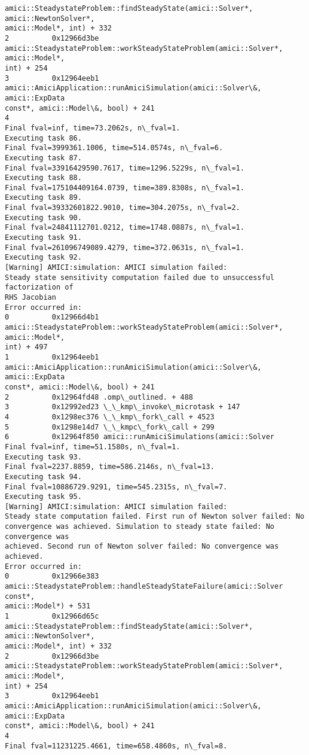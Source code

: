 \documentclass[11pt]{article}
\begin{document}
\begin{Verbatim}[commandchars=\\\{\}]
amici::SteadystateProblem::findSteadyState(amici::Solver*, amici::NewtonSolver*,
amici::Model*, int) + 332
2          0x12966d3be
amici::SteadystateProblem::workSteadyStateProblem(amici::Solver*, amici::Model*,
int) + 254
3          0x12964eeb1
amici::AmiciApplication::runAmiciSimulation(amici::Solver\&, amici::ExpData
const*, amici::Model\&, bool) + 241
4
Final fval=inf, time=73.2062s, n\_fval=1.
Executing task 86.
Final fval=3999361.1006, time=514.0574s, n\_fval=6.
Executing task 87.
Final fval=33916429590.7617, time=1296.5229s, n\_fval=1.
Executing task 88.
Final fval=175104409164.0739, time=389.8308s, n\_fval=1.
Executing task 89.
Final fval=39332601822.9010, time=304.2075s, n\_fval=2.
Executing task 90.
Final fval=24841112701.0212, time=1748.0887s, n\_fval=1.
Executing task 91.
Final fval=261096749089.4279, time=372.0631s, n\_fval=1.
Executing task 92.
[Warning] AMICI:simulation: AMICI simulation failed:
Steady state sensitivity computation failed due to unsuccessful factorization of
RHS Jacobian
Error occurred in:
0          0x12966d4b1
amici::SteadystateProblem::workSteadyStateProblem(amici::Solver*, amici::Model*,
int) + 497
1          0x12964eeb1
amici::AmiciApplication::runAmiciSimulation(amici::Solver\&, amici::ExpData
const*, amici::Model\&, bool) + 241
2          0x12964fd48 .omp\_outlined. + 488
3          0x12992ed23 \_\_kmp\_invoke\_microtask + 147
4          0x1298ec376 \_\_kmp\_fork\_call + 4523
5          0x1298e14d7 \_\_kmpc\_fork\_call + 299
6          0x12964f850 amici::runAmiciSimulations(amici::Solver
Final fval=inf, time=51.1580s, n\_fval=1.
Executing task 93.
Final fval=2237.8859, time=586.2146s, n\_fval=13.
Executing task 94.
Final fval=10886729.9291, time=545.2315s, n\_fval=7.
Executing task 95.
[Warning] AMICI:simulation: AMICI simulation failed:
Steady state computation failed. First run of Newton solver failed: No
convergence was achieved. Simulation to steady state failed: No convergence was
achieved. Second run of Newton solver failed: No convergence was achieved.
Error occurred in:
0          0x12966e383
amici::SteadystateProblem::handleSteadyStateFailure(amici::Solver const*,
amici::Model*) + 531
1          0x12966d65c
amici::SteadystateProblem::findSteadyState(amici::Solver*, amici::NewtonSolver*,
amici::Model*, int) + 332
2          0x12966d3be
amici::SteadystateProblem::workSteadyStateProblem(amici::Solver*, amici::Model*,
int) + 254
3          0x12964eeb1
amici::AmiciApplication::runAmiciSimulation(amici::Solver\&, amici::ExpData
const*, amici::Model\&, bool) + 241
4
Final fval=11231225.4661, time=658.4860s, n\_fval=8.

\end{Verbatim}
\end{document}
